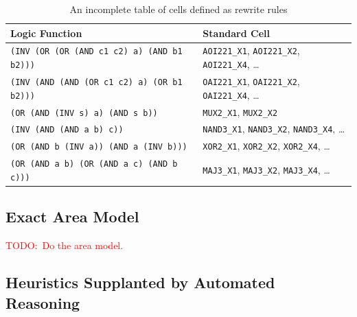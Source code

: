 \documentclass[10pt,letterpaper]{article}
\newcommand{\todo}[1]{\textcolor{red}{TODO:\ #1}}
\begin{document}
\begin{table}[h]
    \centering
    \begin{tabular}{ll}
        \toprule
        \textbf{Logic Function}                            & \textbf{Standard Cell}                                                \\ \midrule
        \texttt{(INV (OR (OR (AND c1 c2) a) (AND b1 b2)))} & \texttt{AOI221\_X1}, \texttt{AOI221\_X2}, \texttt{AOI221\_X4}, \ldots \\
        \texttt{(INV (AND (AND (OR c1 c2) a) (OR b1 b2)))} & \texttt{OAI221\_X1}, \texttt{OAI221\_X2}, \texttt{OAI221\_X4}, \ldots \\
        \texttt{(OR (AND (INV s) a) (AND s b))}            & \texttt{MUX2\_X1}, \texttt{MUX2\_X2}                                  \\
        \texttt{(INV (AND (AND a b) c))}                   & \texttt{NAND3\_X1}, \texttt{NAND3\_X2}, \texttt{NAND3\_X4}, \ldots    \\
        \texttt{(OR (AND b (INV a)) (AND a (INV b)))}      & \texttt{XOR2\_X1}, \texttt{XOR2\_X2}, \texttt{XOR2\_X4}, \ldots       \\
        \texttt{(OR (AND a b) (OR (AND a c) (AND b c)))}   & \texttt{MAJ3\_X1}, \texttt{MAJ3\_X2}, \texttt{MAJ3\_X4}, \ldots       \\
        \bottomrule
    \end{tabular}
    \caption{An incomplete table of cells defined as rewrite rules}\label{tab:morecells}
\end{table}

\subsection{Exact Area Model}\label{sec:alt:area}

\todo{Do the area model.}

\subsection{Heuristics Supplanted by Automated Reasoning}\label{sec:alt:heuristics}
\end{document}
